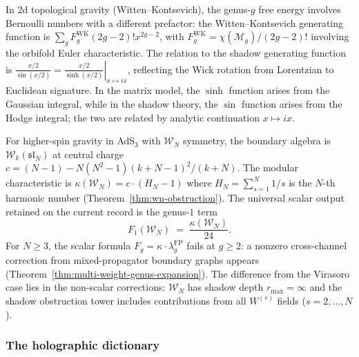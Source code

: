 \begin{remark}
\label{rem:thqg-I-matrix-models}
In 2d topological gravity (Witten--Kontsevich), the genus-$g$ free energy involves Bernoulli numbers with a different prefactor: the Witten--Kontsevich generating function is $\sum_g F_g^{\mathrm{WK}} (2g-2)! x^{2g-2}$, with $F_g^{\mathrm{WK}} = \chi(\mathcal{M}_g) / (2g-2)!$ involving the orbifold Euler characteristic. The relation to the shadow generating function is $\frac{x/2}{\sin(x/2)} = \left.\frac{x/2}{\sinh(x/2)}\right|_{x \mapsto ix}$, reflecting the Wick rotation from Lorentzian to Euclidean signature. In the matrix model, the $\sinh$ function arises from the Gaussian integral, while in the shadow theory, the $\sin$ function arises from the Hodge integral; the two are related by analytic continuation $x \mapsto ix$.
\end{remark}

\begin{remark}
\label{rem:thqg-I-higher-spin}
For higher-spin gravity in AdS$_3$ with $\mathcal{W}_N$ symmetry, the boundary algebra is $\mathcal{W}_k(\mathfrak{sl}_N)$ at central charge $c = (N-1) - N(N^2-1)(k+N-1)^2/(k+N)$. The modular characteristic is $\kappa(\mathcal{W}_N) = c \cdot (H_N - 1)$ where $H_N = \sum_{s=1}^{N} 1/s$ is the $N$-th harmonic number (Theorem~\ref{thm:wn-obstruction}). The universal scalar output retained on the current record is the genus-$1$ term
\[
F_1(\mathcal{W}_N) \;=\; \frac{\kappa(\mathcal{W}_N)}{24}.
\]
For $N \geq 3$, the scalar formula $F_g = \kappa\cdot\lambda_g^{\mathrm{FP}}$ fails at $g \geq 2$:
a nonzero cross-channel correction from mixed-propagator boundary
graphs appears (Theorem~\ref{thm:multi-weight-genus-expansion}).
The difference from the Virasoro case lies in the
non-scalar corrections: $\mathcal{W}_N$ has shadow depth
$r_{\max} = \infty$ and the shadow obstruction tower includes contributions from
all $W^{(s)}$ fields ($s = 2, \ldots, N$).
\end{remark}

\subsubsection{The holographic dictionary}

